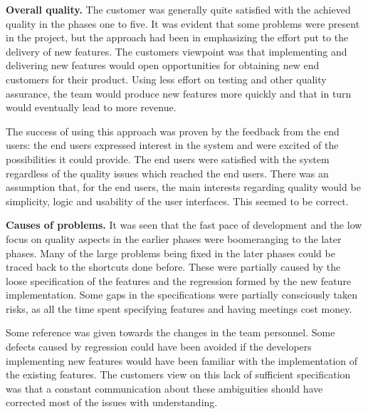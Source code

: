\textbf{Overall quality.} The customer was generally quite satisfied with the achieved quality in the phases one to five. It was evident that some problems were present in the project, but the approach had been in emphasizing the effort put to the delivery of new features. The customers viewpoint was that implementing and delivering new features would open opportunities for obtaining new end customers for their product. Using less effort on testing and other quality assurance, the team would produce new features more quickly and that in turn would eventually lead to more revenue.

The success of using this approach was proven by the feedback from the end users: the end users expressed interest in the system and were excited of the possibilities it could provide. The end users were satisfied with the system regardless of the quality issues which reached the end users. There was an assumption that, for the end users, the main interests regarding quality would be simplicity, logic and usability of the user interfaces. This seemed to be correct.


\textbf{Causes of problems.} It was seen that the fast pace of development and the low focus on quality aspects in the earlier phases were boomeranging to the later phases. Many of the large problems being fixed in the later phases could be traced back to the shortcuts done before. These were partially caused by the loose specification of the features and the regression formed by the new feature implementation. Some gaps in the specifications were partially consciously taken risks, as all the time spent specifying features and having meetings cost money.

Some reference was given towards the changes in the team personnel. Some defects caused by regression could have been avoided if the developers implementing new features would have been familiar with the implementation of the existing features. The customers view on this lack of sufficient specification was that a constant communication about these ambiguities should have corrected most of the issues with understanding.

